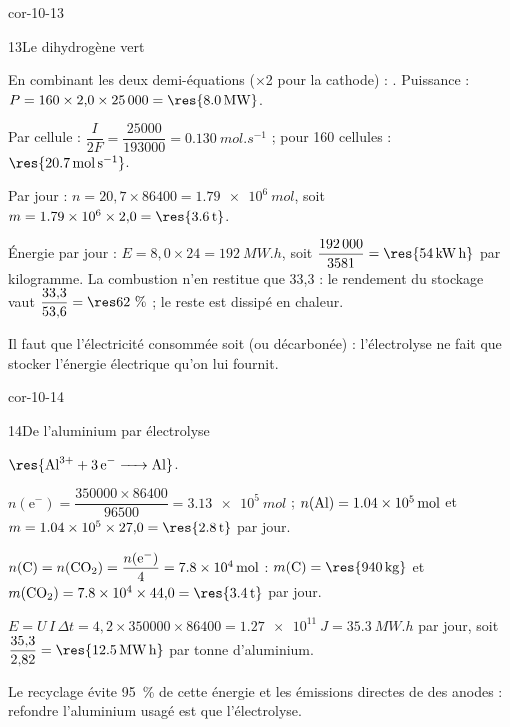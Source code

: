 \begin{blocLivre}{cor-10-13}
\begin{corrige}{13}{Le dihydrogène vert}
\begin{questions}
\item En combinant les deux demi-équations (×2 pour la cathode) : . Puissance :
$P=160\times2{,}0\times\num{25000}=\res{\qty{8,0}{MW}}$.
\item Par cellule : $\dfrac{I}{2F}=\dfrac{\num{25000}}{\num{193000}}=\qty{0,130}{mol.s^{-1}}$ ; pour 160 cellules :
$\res{\qty{20,7}{mol.s^{-1}}}$.
\item Par jour : $n=20{,}7\times86400=\qty{1,79e6}{mol}$, soit $m=\num{1.79e6}\times2{,}0=\res{\qty{3,6}{t}}$.
\item Énergie par jour : $E=8{,}0\times24=\qty{192}{MW.h}$, soit $\dfrac{\num{192000}}{3581}=\res{\qty{54}{kW.h}}$ par
kilogramme. La combustion n'en restitue que 33,3 : le rendement du stockage vaut
$\dfrac{33{,}3}{53{,}6}=\res{62~\%}$ ; le reste est dissipé en chaleur.
\item Il faut que l'électricité consommée soit  (ou décarbonée) : l'électrolyse ne
fait que stocker l'énergie électrique qu'on lui fournit.
\end{questions}
\end{corrige}
\end{blocLivre}
\begin{blocLivre}{cor-10-14}
\begin{corrige}{14}{De l'aluminium par électrolyse}
\begin{questions}
\item $\res{\ce{Al^3+ + 3 e- -> Al}}$.
\item $n(\mathrm{e}^-)=\dfrac{\num{350000}\times86400}{\num{96500}}=\qty{3,13e5}{mol}$ ;
$n(\ce{Al})=\qty{1,04e5}{mol}$ et $m=\num{1.04e5}\times27{,}0=\res{\qty{2,8}{t}}$ par jour.
\item $n(\ce{C})=n(\ce{CO2})=\dfrac{n(\mathrm{e}^-)}{4}=\qty{7,8e4}{mol}$ : $m(\ce{C})=\res{\qty{940}{kg}}$ et
$m(\ce{CO2})=\num{7.8e4}\times44{,}0=\res{\qty{3,4}{t}}$ par jour.
\item $E=U\,I\,\Delta t=4{,}2\times\num{350000}\times86400=\qty{1,27e11}{J}=\qty{35,3}{MW.h}$ par jour, soit
$\dfrac{35{,}3}{2{,}82}=\res{\qty{12,5}{MW.h}}$ par tonne d'aluminium.
\item Le recyclage évite 95~\% de cette énergie et les émissions directes de  des anodes : refondre
l'aluminium usagé est  que l'électrolyse.
\end{questions}
\end{corrige}
\end{blocLivre}
